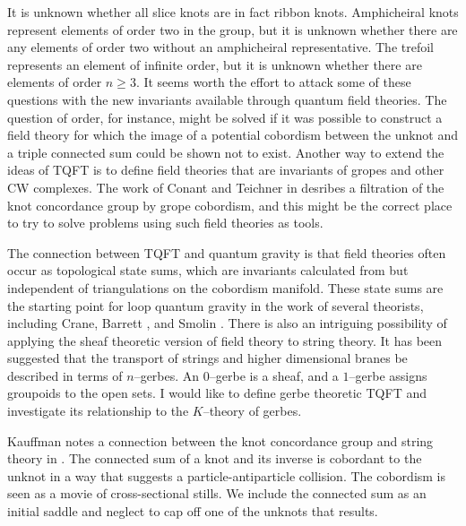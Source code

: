 \documentclass[10pt]{article}
\begin{document}
  \begin{figure}[h]
      \centering
 \end{figure}
   It is unknown whether all slice knots are in fact ribbon knots. Amphicheiral knots represent 
 elements of order two in the group,
 but it is unknown whether there are any elements of order two without an amphicheiral representative.
 The trefoil represents an element of infinite order, but it is unknown whether there are elements of order $n\ge 3.$
 It seems worth the effort to attack some of these questions with the new invariants available through 
 quantum field theories. The question of order, for instance, might be solved if it was possible to
 construct a field theory for which the image of a potential cobordism between the unknot and
 a triple connected sum could be shown not to exist. Another way to extend the ideas of TQFT is to 
 define field theories that are invariants of gropes and other CW complexes. The work of Conant and Teichner
 in \cite{Teich} desribes a filtration of the knot concordance group by grope cobordism,
 and this might be the correct place to try to solve problems using such field
 theories as tools.
  
  The connection between TQFT and quantum gravity is
  that field theories often 
  occur as topological state sums, which are invariants calculated from but independent of
  triangulations on the cobordism
  manifold. These state sums are the starting point for loop quantum gravity in the work of several 
  theorists, including Crane, Barrett \cite{BC}, and Smolin \cite{Smolin}. There is
  also an intriguing possibility of applying the sheaf theoretic version of field theory
  to string theory. It has been
  suggested that the transport of strings and higher dimensional branes be described
  in terms of 
  $n$--gerbes. An $0$--gerbe is a sheaf, and a $1$--gerbe assigns 
  groupoids to the open sets. I would like to define gerbe theoretic TQFT and investigate its
  relationship to the $K$--theory of gerbes.
  
 Kauffman notes a connection between the knot concordance group and string theory in \cite{Kauff}. 
  The connected sum of a knot and its inverse is cobordant to the unknot in a way 
  that suggests a particle-antiparticle collision. The cobordism is seen as a movie of cross-sectional
  stills. 
  We include the connected sum as an initial saddle and neglect to cap off
  one of the unknots that results. 
  
\end{document}
